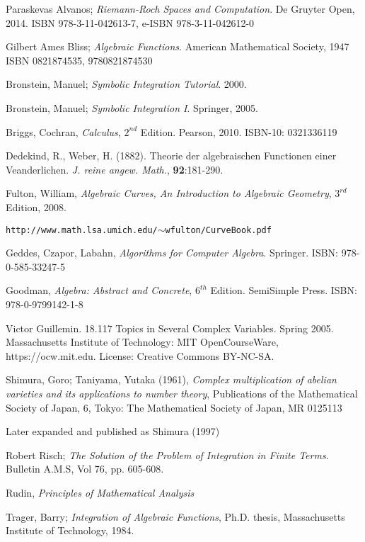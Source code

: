 

\begin{thebibliography}{9}

Paraskevas Alvanos;
{\it Riemann-Roch Spaces and Computation}.
De Gruyter Open, 2014.
ISBN 978-3-11-042613-7, e-ISBN 978-3-11-042612-0

Gilbert Ames Bliss; {\it Algebraic Functions}. American Mathematical Society, 1947
ISBN 0821874535, 9780821874530

Bronstein, Manuel; {\it Symbolic Integration Tutorial}. 2000.

Bronstein, Manuel; {\it Symbolic Integration I}. Springer, 2005.

Briggs, Cochran, {\it Calculus}, $2^{nd}$ Edition.  Pearson, 2010.  ISBN-10: 0321336119

Dedekind, R., Weber, H. (1882). Theorie der algebraischen Functionen einer Veanderlichen.
{\it J. reine angew. Math.}, {\bf 92}:181-290.

Fulton, William, {\it Algebraic Curves, An Introduction to Algebraic Geometry}, $3^{rd}$ Edition, 2008.

{\tt http://www.math.lsa.umich.edu/$\sim$wfulton/CurveBook.pdf}

Geddes, Czapor, Labahn, {\it Algorithms for Computer Algebra}. Springer.
ISBN: 978-0-585-33247-5

Goodman, {\it Algebra: Abstract and Concrete}, $6^{th}$ Edition.  SemiSimple Press.
ISBN: 978-0-9799142-1-8

Victor Guillemin. 18.117 Topics in Several Complex Variables. Spring 2005. Massachusetts Institute of Technology: MIT OpenCourseWare, https://ocw.mit.edu. License: Creative Commons BY-NC-SA.

Shimura, Goro; Taniyama, Yutaka (1961), {\it Complex multiplication of abelian varieties and its applications to number theory},
Publications of the Mathematical Society of Japan, 6, Tokyo: The Mathematical Society of Japan, MR 0125113

Later expanded and published as Shimura (1997)

Robert Risch; {\it The Solution of the Problem of Integration in Finite Terms}.  Bulletin A.M.S, Vol 76, pp. 605-608.

Rudin, {\it Principles of Mathematical Analysis}

Trager, Barry; {\it Integration of Algebraic Functions}, Ph.D. thesis, Massachusetts Institute of Technology, 1984.


\end{thebibliography}
